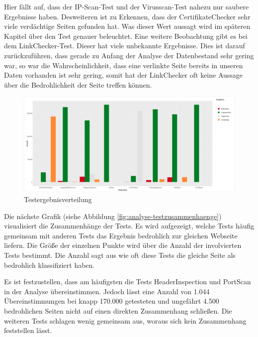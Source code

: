 Hier fällt auf, dass der IP-Scan-Test und der Virusscan-Test nahezu nur saubere Ergebnisse haben. Desweiteren ist zu Erkennen, dass der CertifikateChecker sehr viele verdächtige Seiten gefunden hat. Was dieser Wert aussagt wird im späteren Kapitel über den Test genauer beleuchtet. Eine weitere Beobachtung gibt es bei dem LinkChecker-Test. Dieser hat viele unbekannte Ergebnisse. Dies ist darauf zurückzuführen, dass gerade zu Anfang der Analyse der Datenbestand sehr gering war, so war die Wahrscheinlichkeit, dass eine verlinkte Seite bereits in unseren Daten vorhanden ist sehr gering, somit hat der LinkChecker oft keine Aussage über die Bedrohlichkeit der Seite treffen können.
\begin{figure}[H]
  \centering
  \includegraphics[width=15cm]{images/stats/ergebnisverteilung}
  \caption[Testergebnisverteilung]{Testergebnisverteilung\protect\footnotemark}
  \label{fig:analyse-ergebnisverteilung}
\end{figure}

Die nächste Grafik (siehe Abbildung \ref{fig:analyse-testzusammenhaenge}) visualisiert die Zusammenhänge der Tests. Es wird aufgezeigt, welche Tests häufig gemeinsam mit anderen Tests das Ergebnis bedrohlich zur gleichen Webseite liefern. Die Größe der einzelnen Punkte wird über die Anzahl der involvierten Tests bestimmt. Die Anzahl sagt aus wie oft diese Tests die gleiche Seite als bedrohlich klassifiziert haben.

Es ist festzustellen, dass am häufigsten die Tests HeaderInspection und PortScan in der Analyse übereinstimmen. Jedoch lässt eine Anzahl von 1.044 Übereinstimmungen bei knapp 170.000 getesteten und ungefährt 4.500 bedrohlichen Seiten nicht auf einen direkten Zusammenhang schließen. Die weiteren Tests schlagen wenig gemeinsam aus, woraus sich kein Zusammenhang feststellen lässt.

